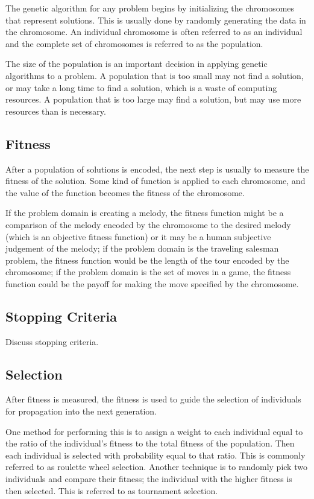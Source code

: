 The genetic algorithm for any problem begins by initializing the chromosomes
that represent solutions. This is usually done by randomly generating the data
in the chromosome. An individual chromosome is often referred to as an
individual and the complete set of chromosomes is referred to as the population.

The size of the population is an important decision in applying genetic
algorithms to a problem. A population that is too small may not find a solution,
or may take a long time to find a solution, which is a waste of computing
resources. A population that is too large may find a solution, but may use more
resources than is necessary.

\subsection{Fitness}

After a population of solutions is encoded, the next step is usually to measure
the fitness of the solution. Some kind of function is applied to each
chromosome, and the value of the function becomes the fitness of the chromosome.

If the problem domain is creating a melody, the fitness function might be a
comparison of the melody encoded by the chromosome to the desired melody (which
is an objective fitness function) or it may be a human subjective judgement of
the melody; if the problem domain is the traveling salesman problem, the fitness
function would be the length of the tour encoded by the chromosome; if the
problem domain is the set of moves in a game, the fitness function could be the
payoff for making the move specified by the chromosome.

\subsection{Stopping Criteria}

Discuss stopping criteria.

\subsection{Selection}

After fitness is measured, the fitness is used to guide the selection of
individuals for propagation into the next generation. 

One method for performing this is to assign a weight to each individual
equal to the ratio of the individual's fitness to the total fitness of the
population. Then each individual is selected with probability equal to that
ratio. This is commonly referred to as roulette wheel selection. Another
technique is to randomly pick two individuals and compare their fitness; the
individual with the higher fitness is then selected. This is referred to as
tournament selection. 

